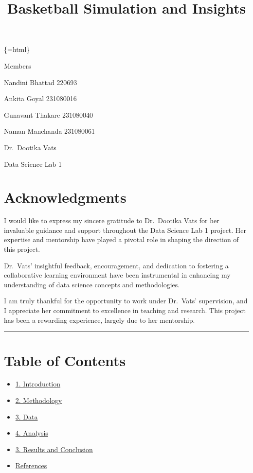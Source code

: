 \documentclass[
]{article}
\title{Basketball Simulation and Insights}
\author{}
\date{\vspace{-2.5em}}
\providecommand{\tightlist}{%
  \setlength{\itemsep}{0pt}\setlength{\parskip}{0pt}}
\begin{document}
\maketitle

\{=html\}

Members

Nandini Bhattad 220693

Ankita Goyal 231080016

Gunavant Thakare 231080040

Naman Manchanda 231080061

Dr.~Dootika Vats

Data Science Lab 1

\hypertarget{acknowledgments}{%
\section{Acknowledgments}\label{acknowledgments}}

I would like to express my sincere gratitude to Dr.~Dootika Vats for her
invaluable guidance and support throughout the Data Science Lab 1
project. Her expertise and mentorship have played a pivotal role in
shaping the direction of this project.

Dr.~Vats' insightful feedback, encouragement, and dedication to
fostering a collaborative learning environment have been instrumental in
enhancing my understanding of data science concepts and methodologies.

I am truly thankful for the opportunity to work under Dr.~Vats'
supervision, and I appreciate her commitment to excellence in teaching
and research. This project has been a rewarding experience, largely due
to her mentorship.

\begin{center}\rule{0.5\linewidth}{0.5pt}\end{center}

\hypertarget{table-of-contents}{%
\section{Table of Contents}\label{table-of-contents}}

\begin{itemize}
\tightlist
\item
  \protect\hyperlink{introduction}{1. Introduction}
\item
  \protect\hyperlink{methodology}{2. Methodology}
\item
  \protect\hyperlink{data}{3. Data}
\item
  \protect\hyperlink{analysis}{4. Analysis}
\item
  \protect\hyperlink{results}{3. Results and Conclusion}
\item
  \protect\hyperlink{references}{References}
\end{itemize}
\end{document}
